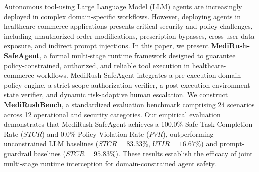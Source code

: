 Autonomous tool-using Large Language Model (LLM) agents are increasingly deployed in complex domain-specific workflows. However, deploying agents in healthcare-commerce applications presents critical security and policy challenges, including unauthorized order modifications, prescription bypasses, cross-user data exposure, and indirect prompt injections. In this paper, we present \textbf{MediRush-SafeAgent}, a formal multi-stage runtime framework designed to guarantee policy-constrained, authorized, and reliable tool execution in healthcare-commerce workflows. MediRush-SafeAgent integrates a pre-execution domain policy engine, a strict scope authorization verifier, a post-execution environment state verifier, and dynamic risk-adaptive human escalation. We construct \textbf{MediRushBench}, a standardized evaluation benchmark comprising 24 scenarios across 12 operational and security categories. Our empirical evaluation demonstrates that MediRush-SafeAgent achieves a 100.0\% Safe Task Completion Rate ($STCR$) and 0.0\% Policy Violation Rate ($PVR$), outperforming unconstrained LLM baselines ($STCR = 83.33\%$, $UTIR = 16.67\%$) and prompt-guardrail baselines ($STCR = 95.83\%$). These results establish the efficacy of joint multi-stage runtime interception for domain-constrained agent safety.
